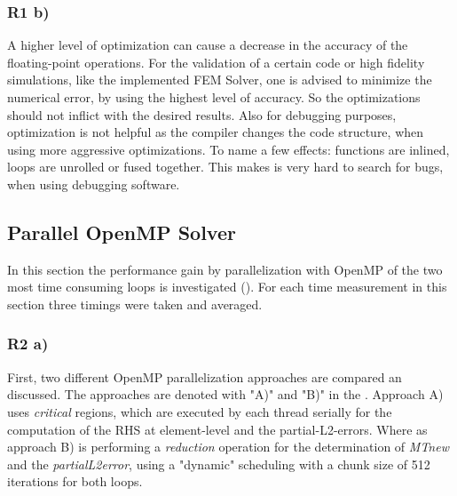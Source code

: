 \label{sec:R1b}
\subsubsection{R1 b)}
A higher level of optimization can cause a decrease in the accuracy of the floating-point operations. For the validation of a certain code or high fidelity simulations, like the implemented FEM Solver, one is advised to minimize the numerical error, by using the highest level of accuracy. So the optimizations should not inflict with the desired results. Also for debugging purposes, optimization is not helpful as the compiler changes the code structure, when using more aggressive optimizations. To name a few effects: functions are inlined, loops are unrolled or fused together. This makes is very hard to search for bugs, when using debugging software.

\clearpage
\subsection{Parallel OpenMP Solver}

In this section the performance gain by parallelization with OpenMP of the two most time consuming loops is investigated (). For each time measurement in this section three timings were taken and averaged.

\subsubsection{R2 a) \label{sec:OpenMPAB}}

First, two different OpenMP parallelization approaches are compared an discussed. The approaches are denoted with "A)" and "B)" in the . Approach A) uses \textit{critical} regions, which are executed by each thread serially for the computation of the RHS at element-level and the partial-L2-errors. Where as approach B) is performing a \textit{reduction} operation for the determination of \textit{MTnew} and the \textit{partialL2error}, using a "dynamic" scheduling with a chunk size of 512 iterations for both loops. 

